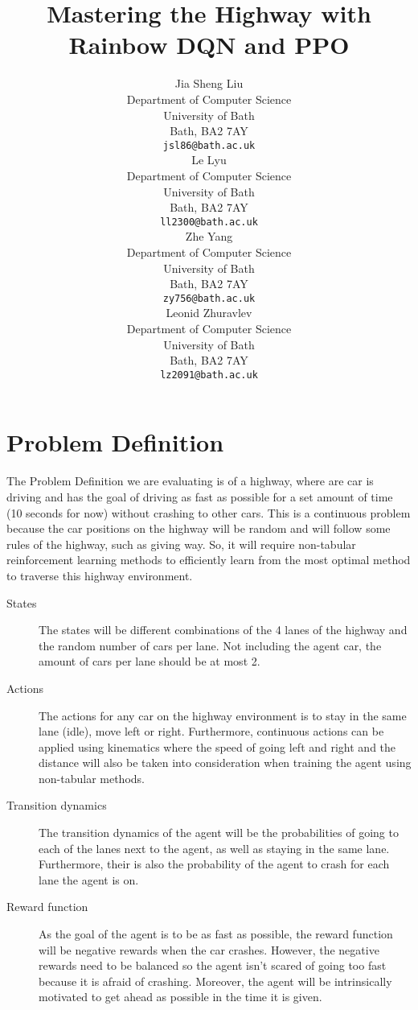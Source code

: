 \documentclass{article}
\title{Mastering the Highway with Rainbow DQN and PPO}
\author{
  Jia Sheng Liu \\
  Department of Computer Science \\
  University of Bath \\
  Bath, BA2 7AY \\
  \texttt{jsl86@bath.ac.uk} \\
  \And
  Le Lyu \\
  Department of Computer Science \\
  University of Bath \\
  Bath, BA2 7AY \\
  \texttt{ll2300@bath.ac.uk} \\
  \And
  Zhe Yang \\
  Department of Computer Science \\
  University of Bath \\
  Bath, BA2 7AY \\
  \texttt{zy756@bath.ac.uk} \\
  \And
  Leonid Zhuravlev \\
  Department of Computer Science \\
  University of Bath \\
  Bath, BA2 7AY \\
  \texttt{lz2091@bath.ac.uk} \\
}
\begin{document}
\maketitle


\section{Problem Definition}


The Problem Definition we are evaluating is of a highway, where are car is driving and has the goal of driving as fast as possible for a set amount of time (10 seconds for now) without crashing to other cars. This is a continuous problem because the car positions on the highway will be random and will follow some rules of the highway, such as giving way. So, it will require non-tabular reinforcement learning methods to efficiently learn from the most optimal method to traverse this highway environment.

\begin{description}
\item[States]The states will be different combinations of the 4 lanes of the highway and the random number of cars per lane. Not including the agent car, the amount of cars per lane should be at most 2.

\item[Actions]The actions for any car on the highway environment is to stay in the same lane (idle), move left or right. Furthermore, continuous actions can be applied using kinematics where the speed of going left and right and the distance will also be taken into consideration when training the agent using non-tabular methods.

\item[Transition dynamics]The transition dynamics of the agent will be the probabilities of going to each of the lanes next to the agent, as well as staying in the same lane. Furthermore, their is also the probability of the agent to crash for each lane the agent is on.

\item[Reward function]As the goal of the agent is to be as fast as possible, the reward function will be negative rewards when the car crashes. However, the negative rewards need to be balanced so the agent isn't scared of going too fast because it is afraid of crashing. Moreover, the agent will be intrinsically motivated to get ahead as possible in the time it is given.
\end{description}
\end{document}
